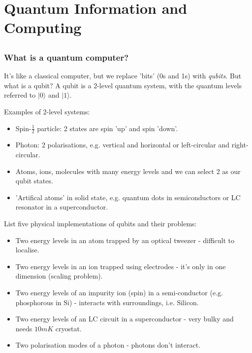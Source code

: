 \documentclass[lasers.tex]{subfiles}
\begin{document}
\part{Quantum Information and Computing}
\chapter{}
\section{What is a quantum computer?}
It's like a classical computer, but we replace 'bits' (0s and 1s) with \emph{qubits.}
But what is a qubit?
A qubit is a 2-level quantum system, with the quantum levels referred to $|0\rangle$ and $|1\rangle$.

Examples of 2-level systems:
\begin{itemize}
    \item Spin-$\frac12$ particle: 2 states are spin 'up' and spin 'down'.
    \item Photon: 2 polarisations, e.g. vertical and horizontal or left-circular and right-circular.
    \item Atoms, ions, molecules with many energy levels and we can select 2 as our qubit states. 
    \item 'Artifical atoms' in solid state, e.g. quantum dots in semiconductors or LC resonator in a superconductor. 
\end{itemize}

List five physical implementations of qubits and their problems:
\begin{itemize}
    \item Two energy levels in an atom trapped by an optical tweezer - difficult to localise. 
    \item Two energy levels in an ion trapped using electrodes - it's only in one dimension (scaling problem). 
    \item Two energy levels of an impurity ion (spin) in a semi-conductor (e.g. phosphorous in Si) - interacts with surroundings, i.e. Silicon.
    \item Two energy levels of an LC circuit in a superconductor - very bulky and needs $10mK$ cryostat. 
    \item Two polarisation modes of a photon - photons don't interact. 
\end{itemize}

\chapter{}
\end{document}

